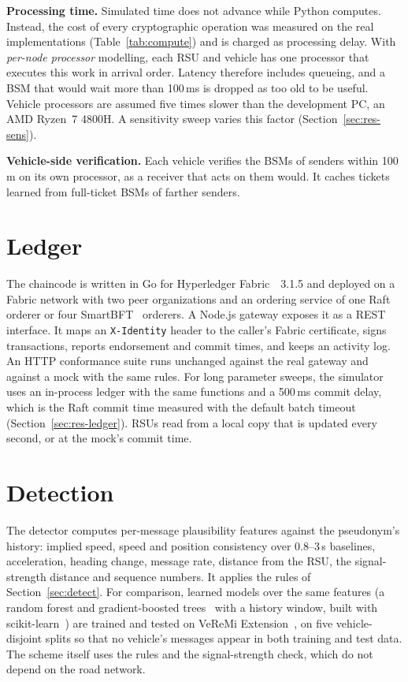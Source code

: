 \textbf{Processing time.} Simulated time does not advance while Python computes. Instead, the cost of
every cryptographic operation was measured on the real implementations
(Table~\ref{tab:compute}) and is charged as processing delay. With \emph{per-node processor} modelling, each
RSU and vehicle has one processor that executes this work in arrival order. Latency therefore
includes queueing, and a BSM that would wait more than 100\,ms is dropped as too old to be useful.
Vehicle processors are assumed five times slower than the development PC, an AMD Ryzen~7 4800H. A
sensitivity sweep varies this factor (Section~\ref{sec:res-sens}).


\textbf{Vehicle-side verification.} Each vehicle verifies the BSMs of senders within 100\,m on its
own processor, as a receiver that acts on them would. It caches tickets learned from full-ticket BSMs
of farther senders.

\section{Ledger}

The chaincode is written in Go for Hyperledger Fabric~\cite{androulaki2018fabric}~3.1.5 and deployed on a Fabric network with two
peer organizations and an ordering service of one Raft~\cite{ongaro2014raft} orderer or four SmartBFT~\cite{barger2021smartbft} orderers. A Node.js
gateway exposes it as a REST interface. It maps an \texttt{X-Identity} header to the caller's Fabric
certificate, signs transactions, reports endorsement and commit times, and keeps an activity log. An
HTTP conformance suite runs unchanged against the real gateway and against a mock with the same
rules. For long parameter sweeps, the simulator uses an in-process ledger with the same functions
and a 500\,ms commit delay, which is the Raft commit time measured with the default batch timeout
(Section~\ref{sec:res-ledger}). RSUs read from a local copy that is updated every second, or at the
mock's commit time.

\section{Detection}

The detector computes per-message plausibility features against the pseudonym's history: implied
speed, speed and position consistency over 0.8--3\,s baselines, acceleration, heading change,
message rate, distance from the RSU, the signal-strength distance and sequence numbers. It applies the
rules of Section~\ref{sec:detect}. For comparison, learned models over the same features (a random
forest and gradient-boosted trees~\cite{friedman2001gbm} with a history window, built with
scikit-learn~\cite{pedregosa2011sklearn}) are trained and tested on VeReMi
Extension~\cite{kamel2020veremiext}, on five vehicle-disjoint splits so that no vehicle's messages
appear in both training and test data. The scheme itself uses the rules and the signal-strength
check, which do not depend on the road network.

